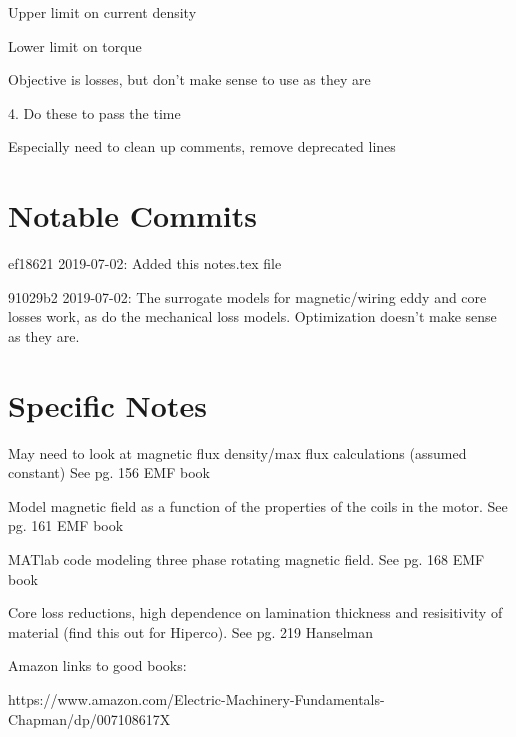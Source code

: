 \documentclass[10pt]{article}
\begin{document}
Upper limit on current density 

Lower limit on torque 

Objective is losses, but don't make sense to use as they are

4. 
Do these to pass the time

Especially need to clean up comments, remove deprecated lines




\section{Notable Commits}

ef18621 2019-07-02: Added this notes.tex file

91029b2 2019-07-02: The surrogate models for magnetic/wiring eddy and core losses work, as do the mechanical loss models. Optimization doesn't make sense as they are.

\section{Specific Notes}

May need to look at magnetic flux density/max flux calculations (assumed constant) See pg. 156 EMF book

Model magnetic field as a function of the properties of the coils in the motor. See pg. 161 EMF book

MATlab code modeling three phase rotating magnetic field. See pg. 168 EMF book

Core loss reductions, high dependence on lamination thickness and resisitivity of material (find this out for Hiperco). See pg. 219 Hanselman

Amazon links to good books:

https://www.amazon.com/Electric-Machinery-Fundamentals-Chapman/dp/007108617X
\end{document}
